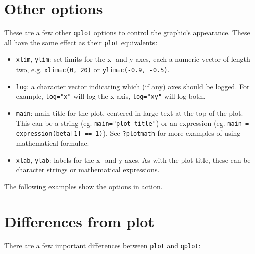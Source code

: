 \section{Other options}\label{sec:other_options}

These are a few other {\tt qplot} options to control the graphic's appearance. These all have the same effect as their {\tt plot} equivalents:

\begin{itemize}
  \item {\tt xlim}, {\tt ylim}: set limits for the x- and y-axes, each a numeric vector of length two, e.g. {\tt xlim=c(0, 20)} or {\tt ylim=c(-0.9, -0.5)}.
  \item {\tt log}: a character vector indicating which (if any) axes should be logged.  For example, {\tt log="x"} will log the x-axis, {\tt log="xy"} will log both.
  \item {\tt main}: main title for the plot, centered in large text at the top of the plot.  This can be a string (eg. {\tt main="plot title"}) or an expression (eg. {\tt main = expression(beta[1] == 1)}).  See {\tt ?plotmath} for more examples of using mathematical formulae.
  \item {\tt xlab}, {\tt ylab}: labels for the x- and y-axes.  As with the plot title, these can be character strings or mathematical expressions.
\end{itemize}

The following examples show the options in action.

% 


\section{Differences from plot}
\label{sec:plot_diffs}

There are a few important differences between {\tt plot} and {\tt qplot}:

